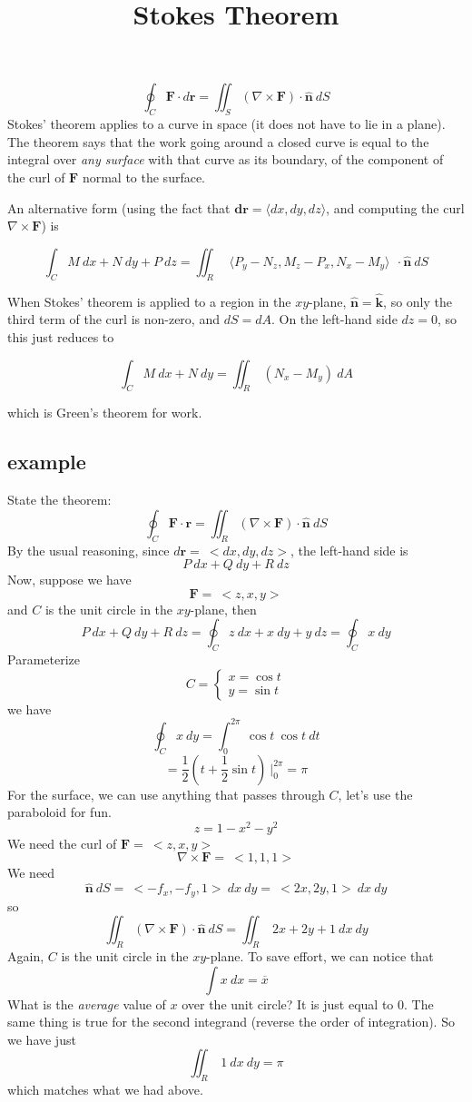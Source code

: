 \documentclass[11pt, oneside]{article}
\title{Stokes Theorem}
\date{}
\begin{document}
\maketitle
\Large


\[ \oint_C \mathbf{F} \cdot d \mathbf{r} = \iint_S ( \nabla \times \mathbf{F}) \cdot \hat{\mathbf{n}} \ dS \]
Stokes' theorem applies to a curve in space (it does not have to lie in a plane).  The theorem says that the work going around a closed curve is equal to the integral over \emph{any surface} with that curve as its boundary, of the component of the curl of $\mathbf{F}$ normal to the surface. 

An alternative form (using the fact that $\mathbf{dr} = \langle dx,dy,dz \rangle$, and computing the curl $\nabla \times \mathbf{F}$) is

\[ \int_C M \ dx + N \ dy + P \ dz = \iint_R   \ \ \langle P_y-N_z,M_z-P_x,N_x-M_y \rangle \  \  \cdot  \hat{\mathbf{n}} \ dS \]

When Stokes' theorem is applied to a region in the $xy$-plane, $\hat{\mathbf{n}} = \hat{\mathbf{k}}$, so only the third term of the curl is non-zero, and $dS = dA$.  On the left-hand side $dz=0$, so this just reduces to

\[  \int_C M \ dx + N \ dy  = \iint_R \ (N_x-M_y) \ dA \]

which is Green's theorem for work.

\subsection*{example}

State the theorem:
\[ \oint_C \mathbf{F} \cdot \mathbf{r} = \iint_R (\nabla \times \mathbf{F}) \cdot \hat{\mathbf{n}} \ dS \]
By the usual reasoning, since $d\mathbf{r} = \ <dx,dy,dz>$, the left-hand side is
\[ P \ dx + Q \ dy + R \ dz \]
Now, suppose we have 
\[ \mathbf{F} = \ <z,x,y> \]
and $C$ is the unit circle in the $xy$-plane,
then 
\[ P \ dx + Q \ dy + R \ dz = \oint_C  z \ dx + x \ dy + y \ dz =   \oint_C x \ dy \]
Parameterize
\[ C =
\left\{
	\begin{array}{l}
		x  = \cos t  \\
		y  = \sin t
	\end{array}
\right.
\]
we have
\[ \oint_C x \ dy = \int_0^{2\pi} \ \cos t \ \cos t \ dt \]
\[ = \frac{1}{2}(t + \frac{1}{2} \sin t) \ \bigg |_0^{2\pi} = \pi \]
For the surface, we can use anything that passes through $C$, let's use the paraboloid for fun.
\[ z = 1 - x^2 - y^2 \]
We need the curl of $\mathbf{F} = \ <z,x,y> $
\[ \nabla \times \mathbf{F} = \ < 1,1,1> \]
We need
\[ \hat{\mathbf{n}} \ dS = \ <-f_x,-f_y,1> \ dx \ dy =  \ <2x,2y,1> \ dx \ dy \]
so
\[ \iint_R (\nabla \times \mathbf{F}) \cdot \hat{\mathbf{n}} \ dS =  \iint_R \ 2x + 2y + 1 \ dx \ dy \]
Again, $C$ is the unit circle in the $xy$-plane.  To save effort, we can notice that 
\[ \int x \ dx = \overline{x} \]
What is the \emph{average} value of $x$ over the unit circle?  It is just equal to $0$.  The same thing is true for the second integrand (reverse the order of integration).  So we have just
\[ \iint_R \  1 \ dx \ dy = \pi \]
which matches what we had above.
\end{document}
